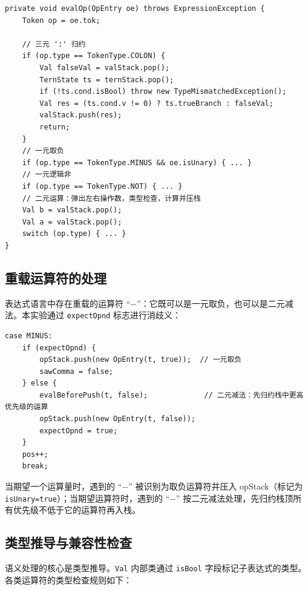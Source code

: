 \begin{lstlisting}[style=cleanjava]
private void evalOp(OpEntry oe) throws ExpressionException {
    Token op = oe.tok;

    // 三元 ':' 归约
    if (op.type == TokenType.COLON) {
        Val falseVal = valStack.pop();
        TernState ts = ternStack.pop();
        if (!ts.cond.isBool) throw new TypeMismatchedException();
        Val res = (ts.cond.v != 0) ? ts.trueBranch : falseVal;
        valStack.push(res);
        return;
    }
    // 一元取负
    if (op.type == TokenType.MINUS && oe.isUnary) { ... }
    // 一元逻辑非
    if (op.type == TokenType.NOT) { ... }
    // 二元运算：弹出左右操作数，类型检查，计算并压栈
    Val b = valStack.pop();
    Val a = valStack.pop();
    switch (op.type) { ... }
}
\end{lstlisting}

\subsection{重载运算符的处理}

表达式语言中存在重载的运算符 ``$-$''：它既可以是一元取负，也可以是二元减法。本实验通过 \texttt{expectOpnd} 标志进行消歧义：

\begin{lstlisting}[style=cleanjava]
case MINUS:
    if (expectOpnd) {
        opStack.push(new OpEntry(t, true));  // 一元取负
        sawComma = false;
    } else {
        evalBeforePush(t, false);             // 二元减法：先归约栈中更高优先级的运算
        opStack.push(new OpEntry(t, false));
        expectOpnd = true;
    }
    pos++;
    break;
\end{lstlisting}

当期望一个运算量时，遇到的 ``$-$'' 被识别为取负运算符并压入 opStack（标记为 \texttt{isUnary=true}）；当期望运算符时，遇到的 ``$-$'' 按二元减法处理，先归约栈顶所有优先级不低于它的运算符再入栈。

\subsection{类型推导与兼容性检查}

语义处理的核心是类型推导。\texttt{Val} 内部类通过 \texttt{isBool} 字段标记子表达式的类型。各类运算符的类型检查规则如下：

